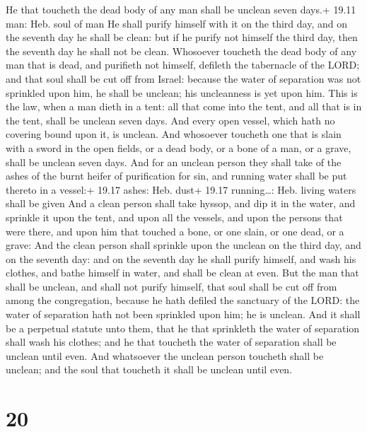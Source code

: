  He that toucheth the dead body of any man shall be
unclean seven days.+ 19.11 man: Heb. soul of man  He shall
purify himself with it on the third day, and on the seventh day he shall
be clean: but if he purify not himself the third day, then the seventh
day he shall not be clean.  Whosoever toucheth the dead
body of any man that is dead, and purifieth not himself, defileth the
tabernacle of the LORD; and that soul shall be cut off from Israel:
because the water of separation was not sprinkled upon him, he shall be
unclean; his uncleanness is yet upon him.  This is the law,
when a man dieth in a tent: all that come into the tent, and all that is
in the tent, shall be unclean seven days.  And every open
vessel, which hath no covering bound upon it, is unclean. 
And whosoever toucheth one that is slain with a sword in the open
fields, or a dead body, or a bone of a man, or a grave, shall be unclean
seven days.  And for an unclean person they shall take of
the ashes of the burnt heifer of purification for sin, and running water
shall be put thereto in a vessel:+ 19.17 ashes: Heb. dust+ 19.17
running\ldots: Heb. living waters shall be given  And a
clean person shall take hyssop, and dip it in the water, and sprinkle it
upon the tent, and upon all the vessels, and upon the persons that were
there, and upon him that touched a bone, or one slain, or one dead, or a
grave:  And the clean person shall sprinkle upon the
unclean on the third day, and on the seventh day: and on the seventh day
he shall purify himself, and wash his clothes, and bathe himself in
water, and shall be clean at even.  But the man that shall
be unclean, and shall not purify himself, that soul shall be cut off
from among the congregation, because he hath defiled the sanctuary of
the LORD: the water of separation hath not been sprinkled upon him; he
is unclean.  And it shall be a perpetual statute unto them,
that he that sprinkleth the water of separation shall wash his clothes;
and he that toucheth the water of separation shall be unclean until
even.  And whatsoever the unclean person toucheth shall be
unclean; and the soul that toucheth it shall be unclean until even.

\hypertarget{section-19}{%
\section{20}\label{section-19}}


